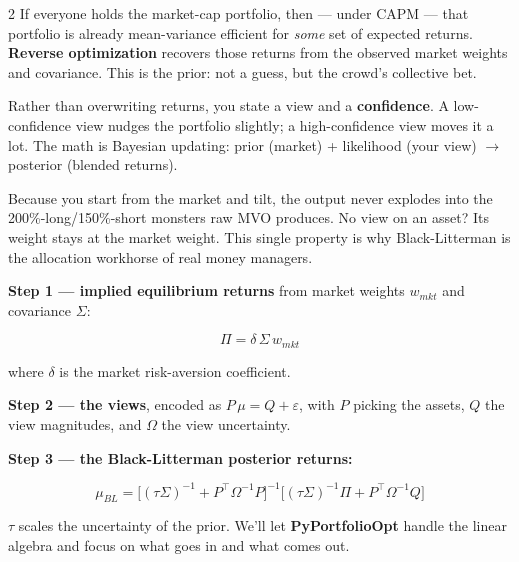 \documentclass{pyportfolios-note}
\begin{document}
\begin{multicols}{2}
If everyone holds the market-cap portfolio, then — under CAPM — that portfolio is
already mean-variance efficient for \textit{some} set of expected returns.
\textbf{Reverse optimization} recovers those returns from the observed market
weights and covariance. This is the prior: not a guess, but the crowd's
collective bet.

Rather than overwriting returns, you state a view and a \textbf{confidence}. A
low-confidence view nudges the portfolio slightly; a high-confidence view moves
it a lot. The math is Bayesian updating: prior (market) + likelihood (your view)
$\rightarrow$ posterior (blended returns).

Because you start from the market and tilt, the output never explodes into the
200\%-long/150\%-short monsters raw MVO produces. No view on an asset? Its
weight stays at the market weight. This single property is why Black-Litterman
is the allocation workhorse of real money managers.
\end{multicols}

\noteneedroom{190bp}

\textbf{Step 1 — implied equilibrium returns} from market weights $w_{mkt}$ and
covariance $\Sigma$:

\[ \Pi = \delta\, \Sigma\, w_{mkt} \]

where $\delta$ is the market risk-aversion coefficient.

\textbf{Step 2 — the views}, encoded as $P\,\mu = Q + \varepsilon$, with $P$
picking the assets, $Q$ the view magnitudes, and $\Omega$ the view uncertainty.

\textbf{Step 3 — the Black-Litterman posterior returns:}

\[ \mu_{BL} = \Big[(\tau\Sigma)^{-1} + P^\top\Omega^{-1}P\Big]^{-1}
   \Big[(\tau\Sigma)^{-1}\Pi + P^\top\Omega^{-1}Q\Big] \]

$\tau$ scales the uncertainty of the prior. We'll let \textbf{PyPortfolioOpt}
handle the linear algebra and focus on what goes in and what comes out.

\noteneedroom{200bp}
\end{document}
